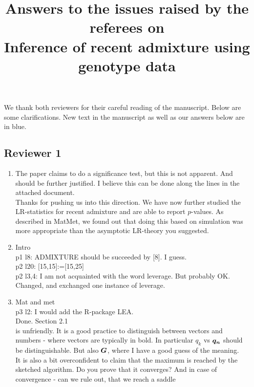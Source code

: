 \documentclass[12pt]{article}
\newcommand{\dickm}[1]{\text{\boldmath ${#1}$}}
\theoremstyle{definition}
\begin{document}
\title{\LARGE Answers to the issues raised by the referees on \\
  Inference of recent admixture using genotype data}

\maketitle

\noindent We thank both reviewers for their careful reading of the
manuscript. Below are some clarifications. New text in the manuscript as well as our answers below are in
{\color{blue}blue}.

\subsection*{Reviewer 1}
\begin{enumerate}
\item The paper claims to do a significance test, but this is not
  apparent. And should be further justified. I believe this can be
  done along the lines in the attached document.
  \\
  {\color{blue}Thanks for pushing us into this direction. We have now further studied the LR-statistics for recent admixture and are able to report $p$-values. As described in MatMet, we found out that doing this based on simulation was more appropriate than the asymptotic LR-theory you suggested.}
\item Intro\\
  p1 l8: ADMIXTURE should be succeeded by [8]. I guess.\\
  p2 l20: [15,15]:=[15,25]\\
  p2 l3,4: I am not acquainted with the word leverage. But probably OK.
  \\ {\color{blue} Changed, and exchanged one instance of leverage.}
\item
  Mat and met\\
  p3 l2: I would add the R-package LEA.  \\ {\color{blue}Done.}
  Section 2.1\\
  is unfriendly. It is a good practice to distinguish between vectors
  and numbers - where vectors are typically in bold. In particular
  $q_k$ vs $\dickm{q_n}$ should be distinguishable. But also
  $\dickm{G}$, where I have a good guess of the meaning. \\
  It is also a bit overconfident to claim that the maximum is reached
  by the sketched algorithm. Do you prove that it converges? And in
  case of convergence - can we rule out, that we reach a saddle

\end{enumerate}
\end{document}
